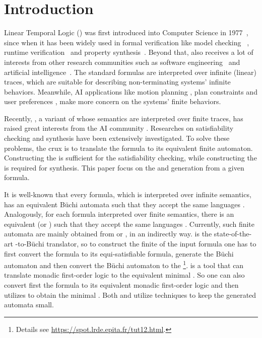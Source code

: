 \section{Introduction}

Linear Temporal Logic (\ltl) was first introduced into Computer Science in 1977~\cite{Pnu77}, since when it has been widely used in formal verification like model checking ~\cite{CGD99}, runtime verification~\cite{BLS11} and property synthesis~\cite{JGWB07,BFJ12}. Beyond that, \ltl also receives a lot of interests from other research communities such as software engineering~\cite{BKMR15} and artificial intelligence~\cite{BK98}. The standard \ltl formulas are interpreted over infinite (linear) traces, which are suitable for describing non-terminating systems' infinite behaviors. Meanwhile, AI applications like motion planning \cite{BK98,DV99,CDV02,PLGG11,CBMM17}, plan constraints \cite{BK00,Gab04} and user preferences \cite{BFM06,BFM11,SBM11}, make more concern on the systems' finite behaviors. 

Recently, \ltlf, a variant of \ltl whose semantics are interpreted over finite traces, has raised great interests from the AI community \cite{GV13,GV15}. Researches on \ltlf satisfiability checking \cite{LZPVH14,LRPZV19} and \ltlf synthesis \cite{GV15} have been extensively investigated. To solve these problems, the crux is to translate the \ltlf formula to its equivalent finite automaton. Constructing the \NFA is sufficient for the satisfiability checking, while constructing the \DFA is required for \ltlf synthesis. This paper focus on the \NFA and \DFA generation from a given \ltlf formula. 

It is well-known that every \ltl formula, which is interpreted over infinite semantics, has an equivalent B\"uchi automata such that they accept the same languages \cite{GPVW95}. Analogously, for each \ltlf formula interpreted over finite semantics, there is an equivalent \NFA (or \DFA) such that they accept the same languages \cite{GV15}. Currently, such finite automata are mainly obtained from \spot \cite{DP04} or \mona \cite{HJJKPRS95,EKM98}, in an indirectly way. \spot is the state-of-the-art \ltl-to-B\"uchi translator, so to construct the finite \NFA of the input \ltlf formula one has to first convert the \ltlf formula to its equi-satisfiable \ltl formula, generate the B\"uchi automaton and then convert the B\"uchi automaton to the \NFA\footnote{Details see \url{https://spot.lrde.epita.fr/tut12.html}.}. \mona is a tool that can translate monadic first-order logic \cite{Tra62} to the equivalent minimal \DFA. So one can also convert first the \ltlf formula to its equivalent monadic first-order logic and then utilizes \mona to obtain the minimal \DFA \cite{}. Both \spot and \mona utilize \BDD techniques to keep the generated automata small. 

